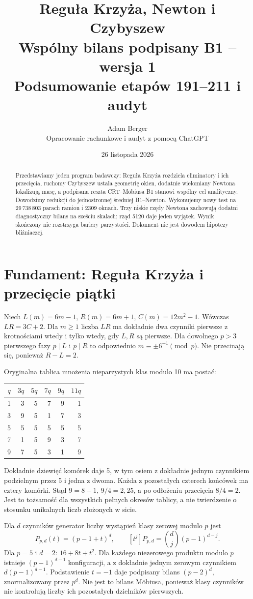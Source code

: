 \documentclass[11pt,a4paper]{article}
\title{Reguła Krzyża, Newton i Czybyszew\\\large Wspólny bilans podpisany B1 -- wersja 1\\ Podsumowanie etapów 191--211 i audyt}
\author{Adam Berger\\Opracowanie rachunkowe i audyt z pomocą ChatGPT}
\date{26 listopada 2026}
\begin{document}
\maketitle
\begin{abstract}
Przedstawiamy jeden program badawczy: Reguła Krzyża rozdziela eliminatory i ich przecięcia, ruchomy Czybyszew ustala geometrię okien, dodatnie wielomiany Newtona lokalizują masę, a podpisana reszta CRT--Möbiusa B1 stanowi wspólny cel analityczny. Dowodzimy redukcji do jednostronnej średniej B1--Newton. Wykonujemy nowy test na 29\,738\,803 parach ramion i 2309 oknach. Trzy niskie rzędy Newtona zachowują dodatni diagnostyczny bilans na sześciu skalach; rząd 5120 daje jeden wyjątek. Wynik skończony nie rozstrzyga bariery parzystości. Dokument nie jest dowodem hipotezy bliźniaczej.
\end{abstract}
\tableofcontents
\section{Fundament: Reguła Krzyża i przecięcie piątki}
Niech $L(m)=6m-1$, $R(m)=6m+1$, $C(m)=12m^2-1$. Wówczas $LR=3C+2$. Dla $m\ge1$ liczba $LR$ ma dokładnie dwa czynniki pierwsze z krotnościami wtedy i tylko wtedy, gdy $L,R$ są pierwsze. Dla dowolnego $p>3$ pierwszego fazy $p\mid L$ i $p\mid R$ to odpowiednio $m\equiv\pm6^{-1}\pmod p$. Nie przecinają się, ponieważ $R-L=2$.

Oryginalna tablica mnożenia nieparzystych klas modulo 10 ma postać:
\begin{center}\begin{tabular}{c|rrrrr}\toprule
$q$&$3q$&$5q$&$7q$&$9q$&$11q$\\\midrule
1&3&5&7&9&1\\3&9&5&1&7&3\\5&5&5&5&5&5\\7&1&5&9&3&7\\9&7&5&3&1&9\\\bottomrule
\end{tabular}\end{center}
Dokładnie dziewięć komórek daje 5, w tym osiem z dokładnie jednym czynnikiem podzielnym przez 5 i jedna z dwoma. Każda z pozostałych czterech końcówek ma cztery komórki. Stąd $9=8+1$, $9/4=2{,}25$, a po odłożeniu przecięcia $8/4=2$. Jest to tożsamość dla wszystkich pełnych okresów tablicy, a nie twierdzenie o stosunku unikalnych liczb złożonych w sicie.

Dla $d$ czynników generator liczby wystąpień klasy zerowej modulo $p$ jest
\[
 P_{p,d}(t)=(p-1+t)^d,\qquad [t^j]P_{p,d}=\binom dj(p-1)^{d-j}.
\]
Dla $p=5$ i $d=2$: $16+8t+t^2$. Dla każdego niezerowego produktu modulo $p$ istnieje $(p-1)^{d-1}$ konfiguracji, a z dokładnie jednym zerowym czynnikiem $d(p-1)^{d-1}$. Podstawienie $t=-1$ daje podpisany bilans $(p-2)^d$, znormalizowany przez $p^d$. Nie jest to bilans Möbiusa, ponieważ klasy czynników nie kontrolują liczby ich pozostałych dzielników pierwszych.
\end{document}
